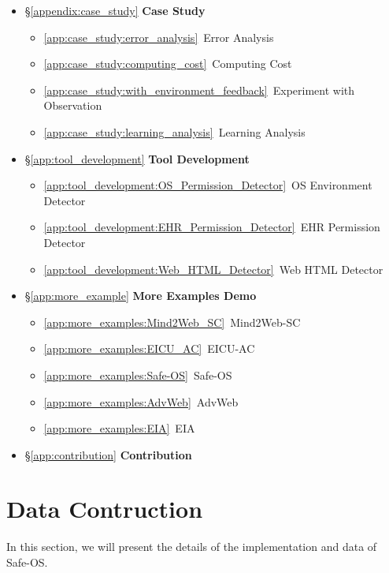 \begin{itemize}
    
    \item \S\ref{appendix:case_study} \textbf{Case Study}
    \begin{itemize}
        \item\ref{app:case_study:error_analysis}~Error Analysis
        \item\ref{app:case_study:computing_cost}~Computing Cost 
        \item\ref{app:case_study:with_environment_feedback}~Experiment with Observation
        \item\ref{app:case_study:learning_analysis}~Learning Analysis
    \end{itemize}

    \item \S\ref{app:tool_development} \textbf{Tool Development}
    \begin{itemize}
        \item \ref{app:tool_development:OS_Permission_Detector}~OS Environment Detector
        \item\ref{app:tool_development:EHR_Permission_Detector}~EHR Permission Detector

        \item\ref{app:tool_development:Web_HTML_Detector}~Web HTML Detector
    \end{itemize}

    \item \S\ref{app:more_example} \textbf{More Examples Demo}
    \begin{itemize}
        \item\ref{app:more_examples:Mind2Web_SC}~Mind2Web-SC
        \item\ref{app:more_examples:EICU_AC}~EICU-AC
        \item\ref{app:more_examples:Safe-OS}~Safe-OS
        \item\ref{app:more_examples:AdvWeb}~AdvWeb
        \item\ref{app:more_examples:EIA}~EIA
    \end{itemize}

    \item \S\ref{app:contribution} \textbf{Contribution}
    

\end{itemize}

\section{Data Contruction}
In this section, we will present the details of the implementation and data of Safe-OS.
\label{app:data}
